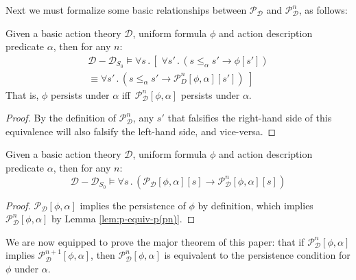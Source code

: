 Next we must formalize some basic relationships between $\mathcal{P}_{\mathcal{D}}$
and $\mathcal{P}_{\mathcal{D}}^{n}$, as follows:

\begin{lemma}
Given a basic action theory $\mathcal{D}$, uniform formula $\phi$
and action description predicate $\alpha$, then for any $n$:\label{lem:p-equiv-p(pn)}\begin{multline*}
\mathcal{D}-\mathcal{D}_{S_{0}}\models\forall s\,.\,\left[\,\,\forall s'\,.\,\left(s\leq_{\alpha}s'\rightarrow\phi[s']\right)\right.\\
\left.\equiv\forall s'\,.\,\left(s\leq_{\alpha}s'\rightarrow\mathcal{P}_{D}^{n}[\phi,\alpha][s']\right)\,\,\right]\end{multline*}
 That is, $\phi$ persists under $\alpha$ iff $\,\mathcal{P}_{\mathcal{D}}^{n}[\phi,\alpha]$
persists under $\alpha$. 
\end{lemma}
\begin{proof}
By the definition of $\mathcal{P}_{\mathcal{D}}^{n}$, any $s'$ that
falsifies the right-hand side of this equivalence will also falsify
the left-hand side, and vice-versa. 
\end{proof}
\begin{lemma}
Given a basic action theory $\mathcal{D}$, uniform formula $\phi$
and action description predicate $\alpha$, then for any $n$:\label{lem:p-implies-pn}\[
\mathcal{D}-\mathcal{D}_{S_{0}}\models\forall s\,.\,\left(\mathcal{P_{D}}[\phi,\alpha][s]\rightarrow\mathcal{P}_{\mathcal{D}}^{n}[\phi,\alpha][s]\right)\]

\end{lemma}
\begin{proof}
$\mathcal{P_{D}}[\phi,\alpha]$ implies the persistence of $\phi$
by definition, which implies $\mathcal{P}_{\mathcal{D}}^{n}[\phi,\alpha]$
by Lemma \ref{lem:p-equiv-p(pn)}. 
\end{proof}
We are now equipped to prove the major theorem of this paper: that
if $\mathcal{P}_{\mathcal{D}}^{n}[\phi,\alpha]$ implies $\mathcal{P}_{\mathcal{D}}^{n+1}[\phi,\alpha]$,
then $\mathcal{P}_{\mathcal{D}}^{n}[\phi,\alpha]$ is equivalent to
the persistence condition for $\phi$ under $\alpha$.

